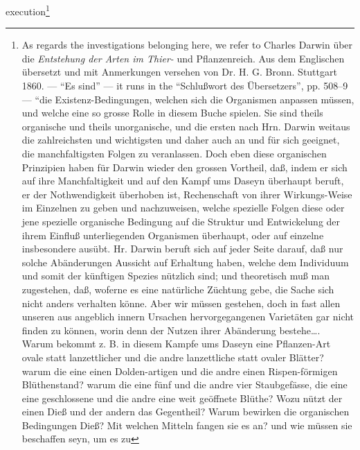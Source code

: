 \documentclass[12pt,a4paper]{book}
\begin{document}
execution\footnote{As regards the investigations belonging here, we refer to
Charles Darwin über die \emph{Entstehung der Arten im Thier-} und Pflanzenreich.
Aus dem Englischen übersetzt und mit Anmerkungen versehen von Dr. H. G. Bronn.
Stuttgart 1860. --- ``Es sind'' --- it runs in the ``Schlußwort des Übersetzers'',
pp. 508--9 --- ``die Existenz-Bedingungen, welchen sich die Organismen anpassen
müssen, und welche eine so grosse Rolle in diesem Buche spielen. Sie sind theils
organische und theils unorganische, und die
ersten nach Hrn. Darwin weitaus die zahlreichsten und wichtigsten und daher auch
an und für sich geeignet, die manchfaltigsten Folgen zu veranlassen. Doch eben
diese organischen Prinzipien haben für Darwin wieder den grossen Vortheil, daß,
indem er sich auf ihre Manchfaltigkeit und auf den Kampf ums Daseyn überhaupt
beruft, er der Nothwendigkeit überhoben ist, Rechenschaft von ihrer
Wirkungs-Weise im Einzelnen zu geben und nachzuweisen, welche spezielle Folgen
diese oder jene spezielle organische Bedingung auf die Struktur und Entwickelung
der ihrem Einfluß unterliegenden Organismen überhaupt, oder auf einzelne
insbesondere ausübt. Hr. Darwin beruft sich auf jeder Seite darauf, daß nur solche
Abänderungen Aussicht auf Erhaltung haben, welche dem Individuum und somit der
künftigen Spezies nützlich sind; und theoretisch muß man zugestehen, daß, woferne
es eine natürliche Züchtung gebe, die Sache sich nicht anders verhalten könne.
Aber wir müssen gestehen, doch in fast allen unseren aus angeblich innern Ursachen
hervorgegangenen Varietäten gar nicht finden zu können, worin denn der Nutzen ihrer
Abänderung bestehe\ldots. Warum bekommt z. B. in diesem Kampfe ums Daseyn eine
Pflanzen-Art ovale statt lanzettlicher und die andre lanzettliche statt ovaler
Blätter? warum die eine einen Dolden-artigen und die andre einen Rispen-förmigen
Blüthenstand? warum die eine fünf und die andre vier Staubgefässe, die eine eine
geschlossene und die andre eine weit geöffnete Blüthe? Wozu nützt der einen Dieß
und der andern das Gegentheil? Warum bewirken die organischen Bedingungen Dieß?
Mit welchen Mitteln fangen sie es an? und wie müssen sie beschaffen seyn, um es zu
}
\end{document}
